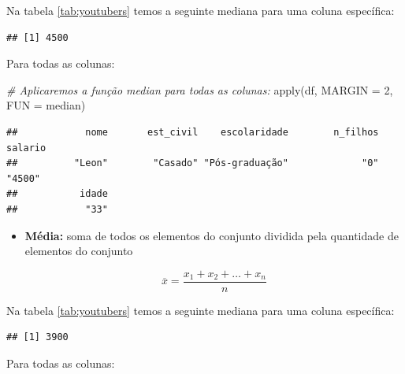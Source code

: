 \documentclass[
]{book}
\newenvironment{Shaded}{\begin{snugshade}}{\end{snugshade}}
\newcommand{\AttributeTok}[1]{\textcolor[rgb]{0.77,0.63,0.00}{#1}}
\newcommand{\CommentTok}[1]{\textcolor[rgb]{0.56,0.35,0.01}{\textit{#1}}}
\newcommand{\DecValTok}[1]{\textcolor[rgb]{0.00,0.00,0.81}{#1}}
\newcommand{\FunctionTok}[1]{\textcolor[rgb]{0.00,0.00,0.00}{#1}}
\newcommand{\NormalTok}[1]{#1}
\newcommand{\SpecialCharTok}[1]{\textcolor[rgb]{0.00,0.00,0.00}{#1}}
\begin{document}
Na tabela \ref{tab:youtubers} temos a seguinte mediana para uma coluna específica:

\begin{Shaded}
\end{Shaded}

\begin{verbatim}
## [1] 4500
\end{verbatim}

Para todas as colunas:

\begin{Shaded}
\begin{Highlighting}[]
\CommentTok{\# Aplicaremos a função median para todas as colunas:}
\FunctionTok{apply}\NormalTok{(df, }\AttributeTok{MARGIN =} \DecValTok{2}\NormalTok{, }\AttributeTok{FUN =}\NormalTok{ median)}
\end{Highlighting}
\end{Shaded}

\begin{verbatim}
##            nome       est_civil    escolaridade        n_filhos         salario 
##          "Leon"        "Casado" "Pós-graduação"             "0"          "4500" 
##           idade 
##            "33"
\end{verbatim}

\begin{itemize}
\item
  \textbf{Média:} soma de todos os elementos do conjunto dividida pela quantidade de elementos do conjunto

  \[
  \overline{x} = \frac{x_1+x_2 + \dots + x_n}{n}
  \]
\end{itemize}

Na tabela \ref{tab:youtubers} temos a seguinte mediana para uma coluna específica:

\begin{Shaded}
\end{Shaded}

\begin{verbatim}
## [1] 3900
\end{verbatim}

Para todas as colunas:
\end{document}
